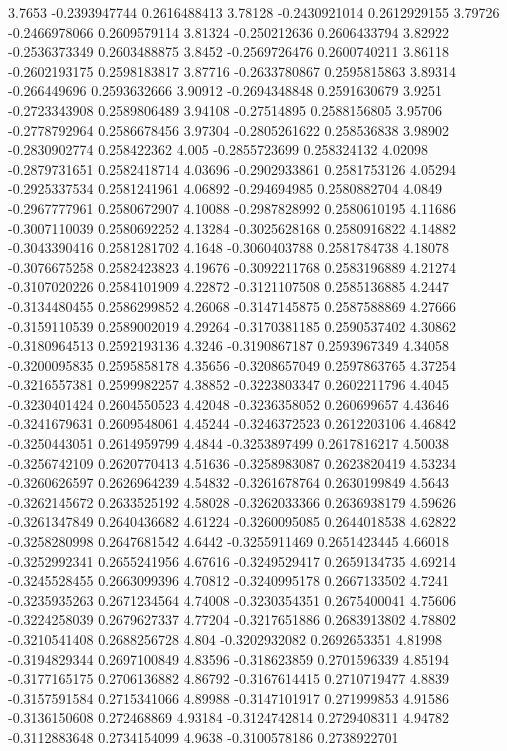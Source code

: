{3.7653 -0.2393947744 0.2616488413
3.78128 -0.2430921014 0.2612929155
3.79726 -0.2466978066 0.2609579114
3.81324 -0.250212636 0.2606433794
3.82922 -0.2536373349 0.2603488875
3.8452 -0.2569726476 0.2600740211
3.86118 -0.2602193175 0.2598183817
3.87716 -0.2633780867 0.2595815863
3.89314 -0.266449696 0.2593632666
3.90912 -0.2694348848 0.2591630679
3.9251 -0.2723343908 0.2589806489
3.94108 -0.27514895 0.2588156805
3.95706 -0.2778792964 0.2586678456
3.97304 -0.2805261622 0.258536838
3.98902 -0.2830902774 0.258422362
4.005 -0.2855723699 0.258324132
4.02098 -0.2879731651 0.2582418714
4.03696 -0.2902933861 0.2581753126
4.05294 -0.2925337534 0.2581241961
4.06892 -0.294694985 0.2580882704
4.0849 -0.2967777961 0.2580672907
4.10088 -0.2987828992 0.2580610195
4.11686 -0.3007110039 0.2580692252
4.13284 -0.3025628168 0.2580916822
4.14882 -0.3043390416 0.2581281702
4.1648 -0.3060403788 0.2581784738
4.18078 -0.3076675258 0.2582423823
4.19676 -0.3092211768 0.2583196889
4.21274 -0.3107020226 0.2584101909
4.22872 -0.3121107508 0.2585136885
4.2447 -0.3134480455 0.2586299852
4.26068 -0.3147145875 0.2587588869
4.27666 -0.3159110539 0.2589002019
4.29264 -0.3170381185 0.2590537402
4.30862 -0.3180964513 0.2592193136
4.3246 -0.3190867187 0.2593967349
4.34058 -0.3200095835 0.2595858178
4.35656 -0.3208657049 0.2597863765
4.37254 -0.3216557381 0.2599982257
4.38852 -0.3223803347 0.2602211796
4.4045 -0.3230401424 0.2604550523
4.42048 -0.3236358052 0.260699657
4.43646 -0.3241679631 0.2609548061
4.45244 -0.3246372523 0.2612203106
4.46842 -0.3250443051 0.2614959799
4.4844 -0.3253897499 0.2617816217
4.50038 -0.3256742109 0.2620770413
4.51636 -0.3258983087 0.2623820419
4.53234 -0.3260626597 0.2626964239
4.54832 -0.3261678764 0.2630199849
4.5643 -0.3262145672 0.2633525192
4.58028 -0.3262033366 0.2636938179
4.59626 -0.3261347849 0.2640436682
4.61224 -0.3260095085 0.2644018538
4.62822 -0.3258280998 0.2647681542
4.6442 -0.3255911469 0.2651423445
4.66018 -0.3252992341 0.2655241956
4.67616 -0.3249529417 0.2659134735
4.69214 -0.3245528455 0.2663099396
4.70812 -0.3240995178 0.2667133502
4.7241 -0.3235935263 0.2671234564
4.74008 -0.3230354351 0.2675400041
4.75606 -0.3224258039 0.2679627337
4.77204 -0.3217651886 0.2683913802
4.78802 -0.3210541408 0.2688256728
4.804 -0.3202932082 0.2692653351
4.81998 -0.3194829344 0.2697100849
4.83596 -0.318623859 0.2701596339
4.85194 -0.3177165175 0.2706136882
4.86792 -0.3167614415 0.2710719477
4.8839 -0.3157591584 0.2715341066
4.89988 -0.3147101917 0.271999853
4.91586 -0.3136150608 0.272468869
4.93184 -0.3124742814 0.2729408311
4.94782 -0.3112883648 0.2734154099
4.9638 -0.3100578186 0.2738922701
}
